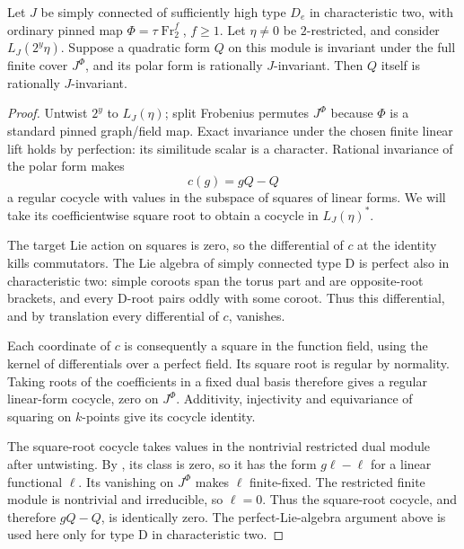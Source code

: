 \begin{lemma}\label{w:quadratic}
Let $J$ be simply connected of sufficiently high type $D_e$ in characteristic two, with ordinary pinned map $\Phi=\tau\operatorname{Fr}_2^f$, $f\ge1$. Let $\eta\ne0$ be $2$-restricted, and consider $L_J(2^y\eta)$. Suppose a quadratic form $Q$ on this module is invariant under the full finite cover $J^\Phi$, and its polar form is rationally $J$-invariant. Then $Q$ itself is rationally $J$-invariant.
\end{lemma}
\begin{proof}
Untwist $2^y$ to $L_J(\eta)$; split Frobenius permutes $J^\Phi$
because $\Phi$ is a standard pinned graph/field map. Exact invariance
under the chosen finite linear lift holds by perfection: its similitude
scalar is a character. Rational invariance of the polar form makes
\[
 c(g)=gQ-Q
\]
a regular cocycle with values in the subspace of squares of linear
forms. We will take its coefficientwise square root to obtain a cocycle
in $L_J(\eta)^*$.

The target Lie action on squares is zero, so the differential of $c$
at the identity kills commutators. The Lie algebra of simply connected
type D is perfect also in characteristic two: simple coroots span the
torus part and are opposite-root brackets, and every D-root pairs oddly
with some coroot. Thus this differential, and by translation every
differential of $c$, vanishes.

Each coordinate of $c$ is consequently a square in the function field,
using the kernel of differentials over a perfect field. Its square root
is regular by normality. Taking roots of the coefficients in a fixed
dual basis therefore gives a regular linear-form cocycle, zero on
$J^\Phi$. Additivity, injectivity and equivariance of squaring on
$k$-points give its cocycle identity.

The square-root cocycle takes values in the nontrivial restricted dual module after untwisting. By , its class is zero, so it has the form $g\ell-\ell$ for a linear functional $\ell$. Its vanishing on $J^\Phi$ makes $\ell$ finite-fixed. The restricted finite module is nontrivial and irreducible, so $\ell=0$. Thus the square-root cocycle, and therefore $gQ-Q$, is identically zero. The perfect-Lie-algebra argument above is used here only for type D in characteristic two.
\end{proof}

